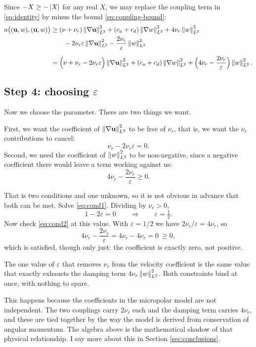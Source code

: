 \documentclass[11pt,a4paper]{article}
\begin{document}
Since $-X \ge -\left\lvert X \right\rvert$ for any real $X$, we may replace the coupling term in
\eqref{eq:identity} by minus the bound \eqref{eq:coupling-bound}:
\begin{align}
  a\big( (\mathbf{u},w),(\mathbf{u},w) \big)
  &\ge (\nu+\nu_{r})\left\lVert \nabla \mathbf{u} \right\rVert_{L^{2}}^{2}
  + (c_{a}+c_{d})\left\lVert \nabla w \right\rVert_{L^{2}}^{2}
  + 4\nu_{r}\left\lVert w \right\rVert_{L^{2}}^{2} \notag \\
  &\qquad {} - 2\nu_{r}\varepsilon\left\lVert \nabla \mathbf{u} \right\rVert_{L^{2}}^{2}
  - \frac{2\nu_{r}}{\varepsilon}\left\lVert w \right\rVert_{L^{2}}^{2} \notag \\[2mm]
  &= \Big( \nu + \nu_{r} - 2\nu_{r}\varepsilon \Big) \left\lVert \nabla \mathbf{u} \right\rVert_{L^{2}}^{2}
  + (c_{a}+c_{d})\left\lVert \nabla w \right\rVert_{L^{2}}^{2}
  + \Big( 4\nu_{r} - \frac{2\nu_{r}}{\varepsilon} \Big) \left\lVert w \right\rVert_{L^{2}}^{2} .
  \label{eq:with-eps}
\end{align}

\subsection{Step 4: choosing $\varepsilon$}

Now we choose the parameter. There are two things we want.

First, we want the coefficient of $\left\lVert \nabla \mathbf{u} \right\rVert_{L^{2}}^{2}$ to be free of
$\nu_{r}$, that is, we want the $\nu_{r}$ contributions to cancel:
\begin{equation}\label{eq:cond1}
  \nu_{r} - 2\nu_{r}\varepsilon = 0 .
\end{equation}
Second, we need the coefficient of $\left\lVert w \right\rVert_{L^{2}}^{2}$ to be non-negative, since a
negative coefficient there would leave a term working against us:
\begin{equation}\label{eq:cond2}
  4\nu_{r} - \frac{2\nu_{r}}{\varepsilon} \ge 0 .
\end{equation}

That is two conditions and one unknown, so it is not obvious in advance that
both can be met. Solve \eqref{eq:cond1}. Dividing by $\nu_{r} > 0$,
\[
  1 - 2\varepsilon = 0 \qquad \Longrightarrow \qquad \varepsilon = \tfrac{1}{2} .
\]
Now check \eqref{eq:cond2} at this value. With $\varepsilon = 1/2$ we have
$2\nu_{r}/\varepsilon = 4\nu_{r}$, so
\[
  4\nu_{r} - \frac{2\nu_{r}}{\varepsilon} = 4\nu_{r} - 4\nu_{r} = 0 \ \ge 0 ,
\]
which is satisfied, though only just: the coefficient is exactly zero, not
positive.

\begin{remark}\label{rem:notcoincidence}
The one value of $\varepsilon$ that removes $\nu_{r}$ from the velocity
coefficient is the same value that exactly exhausts the damping term
$4\nu_{r}\left\lVert w \right\rVert_{L^{2}}^{2}$. Both constraints bind at once, with nothing to spare.

This happens because the coefficients in the micropolar model are not
independent. The two couplings carry $2\nu_{r}$ each and the damping term
carries $4\nu_{r}$, and these are tied together by the way the model is derived
from conservation of angular momentum. The algebra above is the mathematical
shadow of that physical relationship. I say more about this in Section
\ref{sec:conclusions}.
\end{remark}
\end{document}
